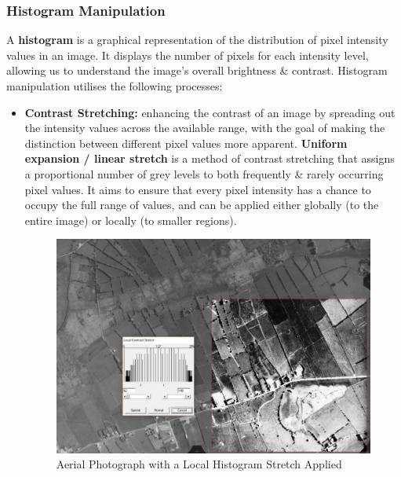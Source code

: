 \documentclass[a4paper,11pt]{article}
\begin{document}
\subsubsection{Histogram Manipulation}
A \textbf{histogram} is a graphical representation of the distribution of pixel intensity values in an image.
It displays the number of pixels for each intensity level, allowing us to understand the image's overall brightness \& contrast.
Histogram manipulation utilises the following processes:
\begin{itemize}
    \item   \textbf{Contrast Stretching:} enhancing the contrast of an image by spreading out the intensity values across the available range, with the goal of making the distinction between different pixel values more apparent.
            \textbf{Uniform expansion / linear stretch} is a method of contrast stretching that assigns a proportional number of grey levels to both frequently \& rarely occurring pixel values.
            It aims to ensure that every pixel intensity has a chance to occupy the full range of values, and can be applied either globally (to the entire image) or locally (to smaller regions).

            \begin{minipage}{\linewidth}
                \begin{figure}[H]
                    \centering
                    \includegraphics[width=\linewidth]{images/local_histogram_stretch_aerial.png}
                    \caption{Aerial Photograph with a Local Histogram Stretch Applied}
                \end{figure}
            \end{minipage}


\end{itemize}
\end{document}
